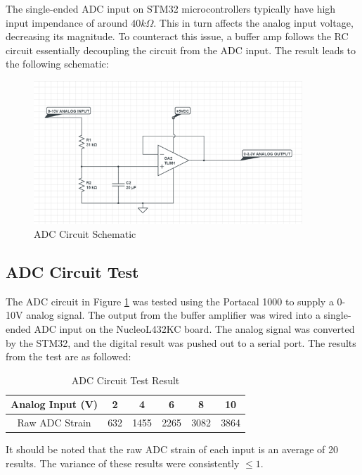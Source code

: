 \documentclass[12pt, a4paper]{article}
\begin{document}
The single-ended ADC input on STM32 microcontrollers typically have high input impendance of around $40k\Omega$. This in turn affects the analog
input voltage, decreasing its magnitude. To counteract this issue, a buffer amp follows the RC circuit essentially decoupling the circuit from the ADC input. The result
leads to the following schematic:
\begin{figure}[H]
    \centering
    \includegraphics[width=0.9\textwidth]{adc_cct.png}
    \caption{ADC Circuit Schematic}
    \label{fig:adc_schem}
\end{figure}
\subsection{ADC Circuit Test} \label{sec:adc_test}
The ADC circuit in Figure \ref{fig:adc_schem} was tested using the Portacal 1000 to supply a 0-10V analog signal. The output from the buffer
amplifier was wired into a single-ended ADC input on the NucleoL432KC board. The analog signal was converted by the STM32,
and the digital result was pushed out to a serial port. The results from the test are as followed:
\begin{center}
    \begin{table}[H]
        \begin{adjustbox}{width=0.7\textwidth, center=\textwidth}
            \small
            \begin{tabular}{||c c c c c c||}
                \hline
                Analog Input (V) & 2 & 4 & 6 & 8 & 10 \\
                \hline
                Raw ADC Strain & 632 & 1455 & 2265 & 3082 & 3864 \\
                \hline
            \end{tabular}
        \end{adjustbox}
        \caption{ADC Circuit Test Result}
        \label{tab:res3}
    \end{table}
\end{center}
It should be noted that the raw ADC strain of each input is an average of 20 results. The variance of these results were
consistently $\leq1$.
\end{document}
